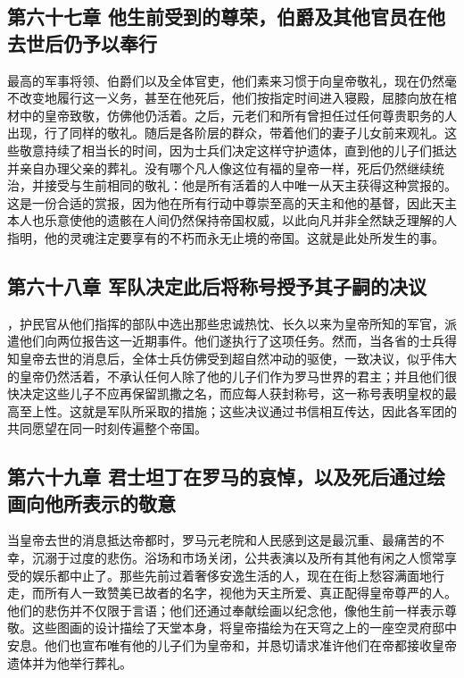 \subsection{第六十七章 他生前受到的尊荣，伯爵及其他官员在他去世后仍予以奉行}

最高的军事将领、伯爵们以及全体官吏，他们素来习惯于向皇帝敬礼，现在仍然毫不改变地履行这一义务，甚至在他死后，他们按指定时间进入寝殿，屈膝向放在棺材中的皇帝致敬，仿佛他仍活着。之后，元老们和所有曾担任过任何尊贵职务的人出现，行了同样的敬礼。随后是各阶层的群众，带着他们的妻子儿女前来观礼。这些敬意持续了相当长的时间，因为士兵们决定这样守护遗体，直到他的儿子们抵达并亲自办理父亲的葬礼。没有哪个凡人像这位有福的皇帝一样，死后仍然继续统治，并接受与生前相同的敬礼：他是所有活着的人中唯一从天主获得这种赏报的。这是一份合适的赏报，因为他在所有行动中尊崇至高的天主和他的基督，因此天主本人也乐意使他的遗骸在人间仍然保持帝国权威，以此向凡并非全然缺乏理解的人指明，他的灵魂注定要享有的不朽而永无止境的帝国。这就是此处所发生的事。\par


\subsection{第六十八章 军队决定此后将称号授予其子嗣的决议}

，护民官从他们指挥的部队中选出那些忠诚热忱、长久以来为皇帝所知的军官，派遣他们向两位报告这一近期事件。他们遂执行了这项任务。然而，当各省的士兵得知皇帝去世的消息后，全体士兵仿佛受到超自然冲动的驱使，一致决议，似乎伟大的皇帝仍然活着，不承认任何人除了他的儿子们作为罗马世界的君主；并且他们很快决定这些儿子不应再保留凯撒之名，而应每人获封称号，这一称号表明皇权的最高至上性。这就是军队所采取的措施；这些决议通过书信相互传达，因此各军团的共同愿望在同一时刻传遍整个帝国。\par


\subsection{第六十九章 君士坦丁在罗马的哀悼，以及死后通过绘画向他所表示的敬意}

当皇帝去世的消息抵达帝都时，罗马元老院和人民感到这是最沉重、最痛苦的不幸，沉溺于过度的悲伤。浴场和市场关闭，公共表演以及所有其他有闲之人惯常享受的娱乐都中止了。那些先前过着奢侈安逸生活的人，现在在街上愁容满面地行走，而所有人一致赞美已故者的名字，视他为天主所爱、真正配得皇帝尊严的人。他们的悲伤并不仅限于言语；他们还通过奉献绘画以纪念他，像他生前一样表示尊敬。这些图画的设计描绘了天堂本身，将皇帝描绘为在天穹之上的一座空灵府邸中安息。他们也宣布唯有他的儿子们为皇帝和，并恳切请求准许他们在帝都接收皇帝遗体并为他举行葬礼。\par

